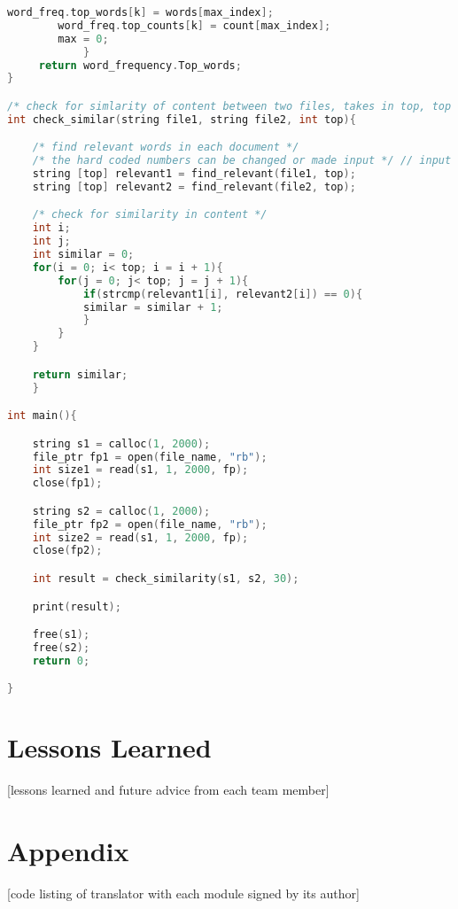 \documentclass{article}
\begin{document}
\begin{lstlisting}[language=C]
		word_freq.top_words[k] = words[max_index];
		word_freq.top_counts[k] = count[max_index];
		max = 0;
	    	}
	 return word_frequency.Top_words;
}

/* check for simlarity of content between two files, takes in top, top i words are compared, returns number of common top words. */
int check_similar(string file1, string file2, int top){

	/* find relevant words in each document */
	/* the hard coded numbers can be changed or made input */ // input would be ideal
	string [top] relevant1 = find_relevant(file1, top); 
	string [top] relevant2 = find_relevant(file2, top);

	/* check for similarity in content */
	int i;
	int j;
	int similar = 0;
	for(i = 0; i< top; i = i + 1){
		for(j = 0; j< top; j = j + 1){
			if(strcmp(relevant1[i], relevant2[i]) == 0){				
			similar = similar + 1; 
			}
		}
	}

	return similar;
	}

int main(){

	string s1 = calloc(1, 2000);
	file_ptr fp1 = open(file_name, "rb");
	int size1 = read(s1, 1, 2000, fp);
	close(fp1);

	string s2 = calloc(1, 2000);
	file_ptr fp2 = open(file_name, "rb");
	int size2 = read(s1, 1, 2000, fp);
	close(fp2);

	int result = check_similarity(s1, s2, 30);

	print(result);

	free(s1);
	free(s2);
	return 0;

}
\end{lstlisting}

\newpage
\section{Lessons Learned}
[lessons learned and future advice from each team member]

\newpage
\section{Appendix}
[code listing of translator with each module signed by its author]
\end{document}
